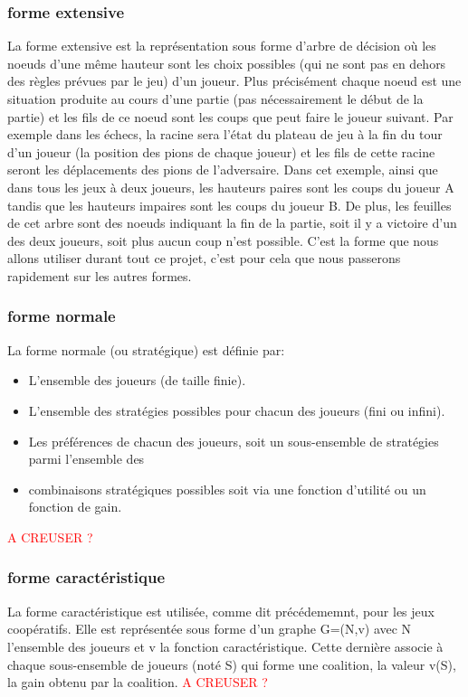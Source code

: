 \documentclass[a4paper, 12pt, french]{article}
\begin{document}
	\subsubsection{forme extensive}
	La forme extensive est la représentation sous forme d'arbre de décision où les noeuds d'une même hauteur sont les
	choix possibles (qui ne sont pas en dehors des règles prévues par le jeu) d'un joueur. Plus précisément chaque
	noeud est une situation produite au cours d'une partie (pas nécessairement le début de la partie) et les fils de
	ce noeud sont les coups que peut faire le joueur suivant. Par exemple dans les échecs, la racine sera l'état du
	plateau de jeu à la fin du tour d'un joueur (la position des pions de chaque joueur) et les fils de cette racine
	seront les déplacements des pions de l'adversaire. Dans cet exemple, ainsi que dans tous les jeux à deux joueurs,
	les hauteurs paires sont les coups du joueur A tandis que les hauteurs impaires sont les coups du joueur B.
	De plus, les feuilles de cet arbre sont des noeuds indiquant la fin de la partie, soit il y a victoire d'un des
	deux joueurs, soit plus aucun coup n'est possible.
	C'est la forme que nous allons utiliser durant tout ce projet, c'est pour cela que nous passerons rapidement sur
	les autres formes.

	\subsubsection{forme normale}
	La forme normale (ou stratégique) est définie par:
	\begin{itemize}
		\item L'ensemble des joueurs (de taille finie).
		\item L'ensemble des stratégies possibles pour chacun des joueurs (fini ou infini).
		\item Les préférences de chacun des joueurs, soit un sous-ensemble de stratégies parmi l'ensemble des
		\item combinaisons stratégiques possibles soit via une fonction d'utilité ou un fonction de gain.
	\end{itemize}
	\textcolor{red}{A CREUSER ?}

	\subsubsection{forme caractéristique}
	La forme caractéristique est utilisée, comme dit précédememnt, pour les jeux coopératifs. Elle est représentée
	sous forme d'un graphe G=(N,v) avec N l'ensemble des joueurs et v la fonction caractéristique. Cette dernière
	associe à chaque sous-ensemble de joueurs (noté S) qui forme une coalition, la valeur v(S), la gain obtenu
	par la coalition. \textcolor{red}{A CREUSER ?}
\end{document}

